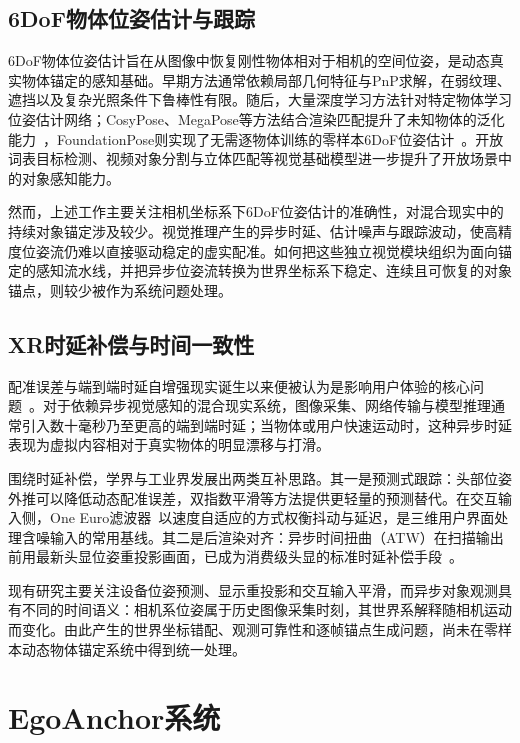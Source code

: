 \documentclass[review]{vgtc}
\begin{document}
\subsection{6DoF物体位姿估计与跟踪}

6DoF物体位姿估计旨在从图像中恢复刚性物体相对于相机的空间位姿，是动态真实物体锚定的感知基础。早期方法通常依赖局部几何特征与PnP求解，在弱纹理、遮挡以及复杂光照条件下鲁棒性有限。随后，大量深度学习方法针对特定物体学习位姿估计网络；CosyPose、MegaPose等方法结合渲染匹配提升了未知物体的泛化能力~\cite{cosypose2020,megapose2022}，FoundationPose则实现了无需逐物体训练的零样本6DoF位姿估计~\cite{foundationpose2023}。开放词表目标检测、视频对象分割与立体匹配等视觉基础模型进一步提升了开放场景中的对象感知能力。

然而，上述工作主要关注相机坐标系下6DoF位姿估计的准确性，对混合现实中的持续对象锚定涉及较少。视觉推理产生的异步时延、估计噪声与跟踪波动，使高精度位姿流仍难以直接驱动稳定的虚实配准。如何把这些独立视觉模块组织为面向锚定的感知流水线，并把异步位姿流转换为世界坐标系下稳定、连续且可恢复的对象锚点，则较少被作为系统问题处理。

\subsection{XR时延补偿与时间一致性}

配准误差与端到端时延自增强现实诞生以来便被认为是影响用户体验的核心问题~\cite{azuma1994improving,diluca2010latency}。对于依赖异步视觉感知的混合现实系统，图像采集、网络传输与模型推理通常引入数十毫秒乃至更高的端到端时延；当物体或用户快速运动时，这种异步时延表现为虚拟内容相对于真实物体的明显漂移与打滑。

围绕时延补偿，学界与工业界发展出两类互补思路。其一是预测式跟踪：头部位姿外推可以降低动态配准误差，双指数平滑等方法提供更轻量的预测替代。在交互输入侧，One Euro滤波器~\cite{casiez2012oneeuro}以速度自适应的方式权衡抖动与延迟，是三维用户界面处理含噪输入的常用基线。其二是后渲染对齐：异步时间扭曲（ATW）在扫描输出前用最新头显位姿重投影画面，已成为消费级头显的标准时延补偿手段~\cite{vanwaveren2016atw}。

现有研究主要关注设备位姿预测、显示重投影和交互输入平滑，而异步对象观测具有不同的时间语义：相机系位姿属于历史图像采集时刻，其世界系解释随相机运动而变化。由此产生的世界坐标错配、观测可靠性和逐帧锚点生成问题，尚未在零样本动态物体锚定系统中得到统一处理。

\section{EgoAnchor系统}\label{sec:system}
\end{document}

